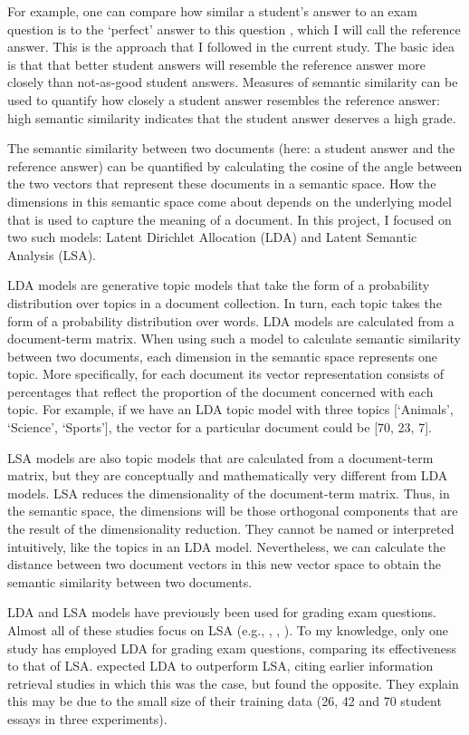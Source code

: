 \documentclass[a4paper,10pt,twoside]{article}
\begin{document}
For example, one can compare how similar a student's answer to an exam question is to the `perfect' answer to this question \cite{wolfe1998}, which I will call the reference answer. This is the approach that I followed in the current study. The basic idea is that that better student answers will resemble the reference answer more closely than not-as-good student answers. Measures of semantic similarity can be used to quantify how closely a student answer resembles the reference answer: high semantic similarity indicates that the student answer deserves a high grade.

The semantic similarity between two documents (here: a student answer and the reference answer) can be quantified by calculating the cosine of the angle between the two vectors that represent these documents in a semantic space. How the dimensions in this semantic space come about depends on the underlying model that is used to capture the meaning of a document. In this project, I focused on two such models: Latent Dirichlet Allocation (LDA) and Latent Semantic Analysis (LSA).

LDA models \cite{blei2003} are generative topic models that take the form of a probability distribution over topics in a document collection. In turn, each topic takes the form of a probability distribution over words. LDA models are calculated from a document-term matrix. When using such a model to calculate semantic similarity between two documents, each dimension in the semantic space represents one topic. More specifically, for each document its vector representation consists of percentages that reflect the proportion of the document concerned with each topic. For example, if we have an LDA topic model with three topics [`Animals', `Science', `Sports'], the vector for a particular document could be [70, 23, 7].

LSA models \cite{landauer1997} are also topic models that are calculated from a document-term matrix, but they are conceptually and mathematically very different from LDA models. LSA reduces the dimensionality of the document-term matrix. Thus, in the semantic space, the dimensions will be those orthogonal components that are the result of the dimensionality reduction. They cannot be named or interpreted intuitively, like the topics in an LDA model. Nevertheless, we can calculate the distance between two document vectors in this new vector space to obtain the semantic similarity between two documents.

LDA and LSA models have previously been used for grading exam questions. Almost all of these studies focus on LSA (e.g., , , ). To my knowledge, only one study \cite{kakkonen2008} has employed LDA for grading exam questions, comparing its effectiveness to that of LSA.  expected LDA to outperform LSA, citing earlier information retrieval studies in which this was the case, but found the opposite. They explain this may be due to the small size of their training data (26, 42 and 70 student essays in three experiments).
\end{document}
